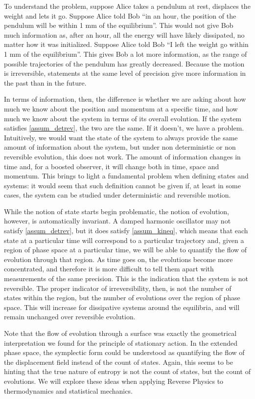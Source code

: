 To understand the problem, suppose Alice takes a pendulum at rest, displaces the weight and lets it go. Suppose Alice told Bob ``in an hour, the position of the pendulum will be within 1 mm of the equilibrium''. This would not give Bob much information as, after an hour, all the energy will have likely dissipated, no matter how it was initialized. Suppose Alice told Bob ``I left the weight go within 1 mm of the equilibrium''. This gives Bob a lot more information, as the range of possible trajectories of the pendulum has greatly decreased. Because the motion is irreversible, statements at the same level of precision give more information in the past than in the future.

In terms of information, then, the difference is whether we are asking about how much we know about the position and momentum at a specific time, and how much we know about the system in terms of its overall evolution. If the system satisfies \ref{assum_detrev}, the two are the same. If it doesn't, we have a problem. Intuitively, we would want the state of the system to always provide the same amount of information about the system, but under non deterministic or non reversible evolution, this does not work. The amount of information changes in time and, for a boosted observer, it will change both in time, space and momentum. This brings to light a fundamental problem when defining states and systems: it would seem that such definition cannot be given if, at least in some cases, the system can be studied under deterministic and reversible motion.

While the notion of state starts begin problematic, the notion of evolution, however, is automatically invariant. A damped harmonic oscillator may not satisfy \ref{assum_detrev}, but it does satisfy \ref{assum_kineq}, which means that each state at a particular time will correspond to a particular trajectory and, given a region of phase space at a particular time, we will be able to quantify the flow of evolution through that region. As time goes on, the evolutions become more concentrated, and therefore it is more difficult to tell them apart with measurements of the same precision. This is the indication that the system is not reversible. The proper indicator of irreversibility, then, is not the number of states within the region, but the number of evolutions over the region of phase space. This will increase for dissipative systems around the equilibria, and will remain unchanged over reversible evolution.

Note that the flow of evolution through a surface was exactly the geometrical interpretation we found for the principle of stationary action. In the extended phase space, the symplectic form could be understood as quantifying the flow of the displacement field instead of the count of states. Again, this seems to be hinting that the true nature of entropy is not the count of states, but the count of evolutions. We will explore these ideas when applying Reverse Physics to thermodynamics and statistical mechanics.

